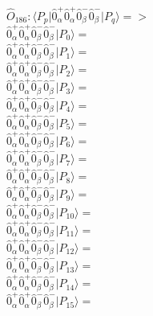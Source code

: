 \documentclass[14pt]{article}
\begin{document}
    $\hat{O}_{186}:  \langle{P_p}\vert \hat{0}_{\alpha}^{+}\hat{0}_{\alpha}^{+}\hat{0}_{\beta}^{-}\hat{0}_{\beta}^{-} \vert{P_q}\rangle => $ \\ 
    $ \hat{0}_{\alpha}^{+}\hat{0}_{\alpha}^{+}\hat{0}_{\beta}^{-}\hat{0}_{\beta}^{-} \vert{P_{0}}\rangle =  $ \\ 
    $ \hat{0}_{\alpha}^{+}\hat{0}_{\alpha}^{+}\hat{0}_{\beta}^{-}\hat{0}_{\beta}^{-} \vert{P_{1}}\rangle =  $ \\ 
    $ \hat{0}_{\alpha}^{+}\hat{0}_{\alpha}^{+}\hat{0}_{\beta}^{-}\hat{0}_{\beta}^{-} \vert{P_{2}}\rangle =  $ \\ 
    $ \hat{0}_{\alpha}^{+}\hat{0}_{\alpha}^{+}\hat{0}_{\beta}^{-}\hat{0}_{\beta}^{-} \vert{P_{3}}\rangle =  $ \\ 
    $ \hat{0}_{\alpha}^{+}\hat{0}_{\alpha}^{+}\hat{0}_{\beta}^{-}\hat{0}_{\beta}^{-} \vert{P_{4}}\rangle =  $ \\ 
    $ \hat{0}_{\alpha}^{+}\hat{0}_{\alpha}^{+}\hat{0}_{\beta}^{-}\hat{0}_{\beta}^{-} \vert{P_{5}}\rangle =  $ \\ 
    $ \hat{0}_{\alpha}^{+}\hat{0}_{\alpha}^{+}\hat{0}_{\beta}^{-}\hat{0}_{\beta}^{-} \vert{P_{6}}\rangle =  $ \\ 
    $ \hat{0}_{\alpha}^{+}\hat{0}_{\alpha}^{+}\hat{0}_{\beta}^{-}\hat{0}_{\beta}^{-} \vert{P_{7}}\rangle =  $ \\ 
    $ \hat{0}_{\alpha}^{+}\hat{0}_{\alpha}^{+}\hat{0}_{\beta}^{-}\hat{0}_{\beta}^{-} \vert{P_{8}}\rangle =  $ \\ 
    $ \hat{0}_{\alpha}^{+}\hat{0}_{\alpha}^{+}\hat{0}_{\beta}^{-}\hat{0}_{\beta}^{-} \vert{P_{9}}\rangle =  $ \\ 
    $ \hat{0}_{\alpha}^{+}\hat{0}_{\alpha}^{+}\hat{0}_{\beta}^{-}\hat{0}_{\beta}^{-} \vert{P_{10}}\rangle =  $ \\ 
    $ \hat{0}_{\alpha}^{+}\hat{0}_{\alpha}^{+}\hat{0}_{\beta}^{-}\hat{0}_{\beta}^{-} \vert{P_{11}}\rangle =  $ \\ 
    $ \hat{0}_{\alpha}^{+}\hat{0}_{\alpha}^{+}\hat{0}_{\beta}^{-}\hat{0}_{\beta}^{-} \vert{P_{12}}\rangle =  $ \\ 
    $ \hat{0}_{\alpha}^{+}\hat{0}_{\alpha}^{+}\hat{0}_{\beta}^{-}\hat{0}_{\beta}^{-} \vert{P_{13}}\rangle =  $ \\ 
    $ \hat{0}_{\alpha}^{+}\hat{0}_{\alpha}^{+}\hat{0}_{\beta}^{-}\hat{0}_{\beta}^{-} \vert{P_{14}}\rangle =  $ \\ 
    $ \hat{0}_{\alpha}^{+}\hat{0}_{\alpha}^{+}\hat{0}_{\beta}^{-}\hat{0}_{\beta}^{-} \vert{P_{15}}\rangle =  $ \\ 
    
\end{document}
